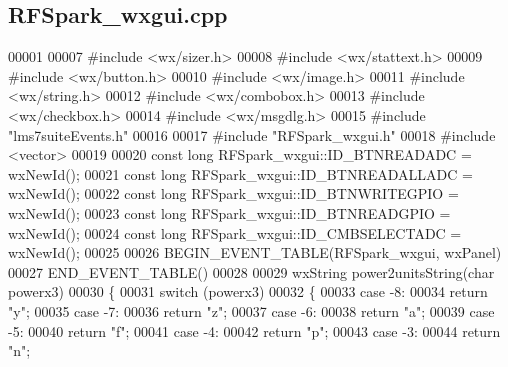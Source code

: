 \subsection{R\+F\+Spark\+\_\+wxgui.\+cpp}
\label{RFSpark__wxgui_8cpp_source}

\begin{DoxyCode}
00001 
00007 \textcolor{preprocessor}{#include <wx/sizer.h>}
00008 \textcolor{preprocessor}{#include <wx/stattext.h>}
00009 \textcolor{preprocessor}{#include <wx/button.h>}
00010 \textcolor{preprocessor}{#include <wx/image.h>}
00011 \textcolor{preprocessor}{#include <wx/string.h>}
00012 \textcolor{preprocessor}{#include <wx/combobox.h>}
00013 \textcolor{preprocessor}{#include <wx/checkbox.h>}
00014 \textcolor{preprocessor}{#include <wx/msgdlg.h>}
00015 \textcolor{preprocessor}{#include "lms7suiteEvents.h"}
00016 
00017 \textcolor{preprocessor}{#include "RFSpark_wxgui.h"}
00018 \textcolor{preprocessor}{#include <vector>}
00019 
00020 \textcolor{keyword}{const} \textcolor{keywordtype}{long} RFSpark_wxgui::ID_BTNREADADC = wxNewId();
00021 \textcolor{keyword}{const} \textcolor{keywordtype}{long} RFSpark_wxgui::ID_BTNREADALLADC = wxNewId();
00022 \textcolor{keyword}{const} \textcolor{keywordtype}{long} RFSpark_wxgui::ID_BTNWRITEGPIO = wxNewId();
00023 \textcolor{keyword}{const} \textcolor{keywordtype}{long} RFSpark_wxgui::ID_BTNREADGPIO = wxNewId();
00024 \textcolor{keyword}{const} \textcolor{keywordtype}{long} RFSpark_wxgui::ID_CMBSELECTADC = wxNewId();
00025 
00026 BEGIN\_EVENT\_TABLE(RFSpark_wxgui, wxPanel)
00027 END\_EVENT\_TABLE()
00028 
00029 wxString power2unitsString(\textcolor{keywordtype}{char} powerx3)
00030 \{
00031     \textcolor{keywordflow}{switch} (powerx3)
00032     \{
00033     \textcolor{keywordflow}{case} -8:
00034         \textcolor{keywordflow}{return} \textcolor{stringliteral}{"y"};
00035     \textcolor{keywordflow}{case} -7:
00036         \textcolor{keywordflow}{return} \textcolor{stringliteral}{"z"};
00037     \textcolor{keywordflow}{case} -6:
00038         \textcolor{keywordflow}{return} \textcolor{stringliteral}{"a"};
00039     \textcolor{keywordflow}{case} -5:
00040         \textcolor{keywordflow}{return} \textcolor{stringliteral}{"f"};
00041     \textcolor{keywordflow}{case} -4:
00042         \textcolor{keywordflow}{return} \textcolor{stringliteral}{"p"};
00043     \textcolor{keywordflow}{case} -3:
00044         \textcolor{keywordflow}{return} \textcolor{stringliteral}{"n"};

\end{DoxyCode}

